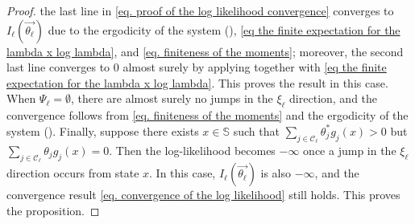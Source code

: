 \documentclass[pdflatex,sn-mathphys-num]{sn-jnl}%
\theoremstyle{thmstyleone}%
\theoremstyle{thmstyletwo}%
\theoremstyle{thmstylethree}%
\begin{document}
\begin{appendices}
\begin{proof}
    the last line in \eqref{eq. proof of the log likelihood convergence} converges to $I_{\ell}\left(\overrightarrow{\theta_\ell}\right)$ due to the ergodicity of the system (), \eqref{eq the finite expectation for the lambda x log lambda}, and \eqref{eq. finiteness of the moments};
    moreover, the second last line converges to 0 almost surely by applying \cite[Theorem 9 in Chapter 2.6]{liptser1989theory} together with \eqref{eq the finite expectation for the lambda x log lambda}.
    This proves the result in this case.
    When $\Psi_\ell = \emptyset$, there are almost surely no jumps in the $\xi_\ell$ direction, and the convergence follows from \eqref{eq. finiteness of the moments} and the ergodicity of the system ().
    Finally, suppose there exists $x\in \mathbb S$ such that $\sum_{j\in\mathcal C_\ell}\theta^*_j g_j(x)>0$ but $\sum_{j\in\mathcal C_\ell}\theta_j g_j(x)=0$.
    Then the log-likelihood becomes $-\infty$ once a jump in the $\xi_\ell$ direction occurs from state $x$.
    In this case, $I_{\ell}\left(\overrightarrow{\theta_\ell}\right)$ is also $-\infty$, and the convergence result \eqref{eq. convergence of the log likelihood} still holds. 
    This proves the proposition. 
\end{proof}



\end{appendices}
\end{document}
